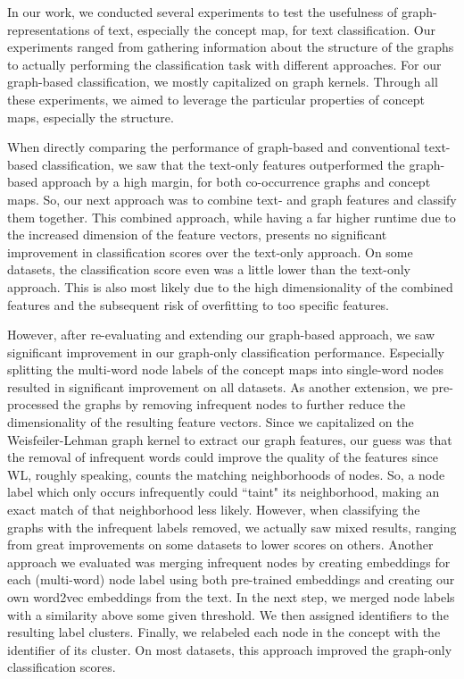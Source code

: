 In our work, we conducted several experiments to test the usefulness of graph-representations of text, especially the concept map, for text classification.
Our experiments ranged from gathering information about the structure of the graphs to actually performing the classification task with different approaches.
For our graph-based classification, we mostly capitalized on graph kernels.
Through all these experiments, we aimed to leverage the particular properties of concept maps, especially the structure.

When directly comparing the performance of graph-based and conventional text-based classification, we saw that the text-only features outperformed the graph-based approach by a high margin, for both co-occurrence graphs and concept maps.
So, our next approach was to combine text- and graph features and classify them together.
This combined approach, while having a far higher runtime due to the increased dimension of the feature vectors, presents no significant improvement in classification scores over the text-only approach.
On some datasets, the classification score even was a little lower than the text-only approach.
This is also most likely due to the high dimensionality of the combined features and the subsequent risk of overfitting to too specific features.

However, after re-evaluating and extending our graph-based approach, we saw significant improvement in our graph-only classification performance.
Especially splitting the multi-word node labels of the concept maps into single-word nodes resulted in significant improvement on all datasets.
As another extension, we pre-processed the graphs by removing infrequent nodes to further reduce the dimensionality of the resulting feature vectors.
Since we capitalized on the Weisfeiler-Lehman graph kernel to extract our graph features, our guess was that the removal of infrequent words could improve the quality of the features since WL, roughly speaking, counts the matching neighborhoods of nodes.
So, a node label which only occurs infrequently could ``taint" its neighborhood, making an exact match of that neighborhood less likely.
However, when classifying the graphs with the infrequent labels removed, we actually saw mixed results, ranging from great improvements on some datasets to lower scores on others.
Another approach we evaluated was merging infrequent nodes by creating embeddings for each (multi-word) node label using both pre-trained embeddings and creating our own word2vec embeddings from the text.
In the next step, we merged node labels with a similarity above some given threshold.
We then assigned identifiers to the resulting label clusters.
Finally, we relabeled each node in the concept with the identifier of its cluster.
On most datasets, this approach improved the graph-only classification scores.

